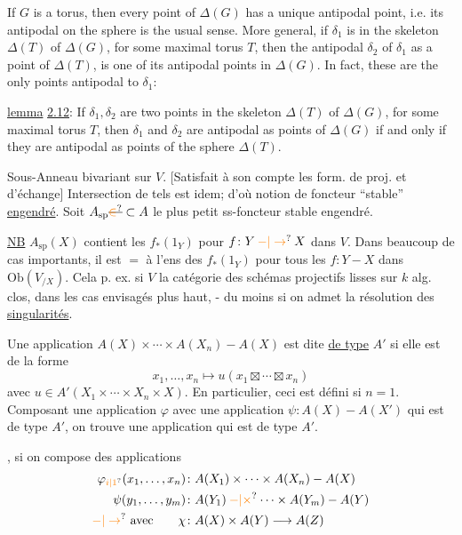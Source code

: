If $G$ is a torus, then every point of $\Delta(G)$ has a unique antipodal point, i.e. its antipodal on the sphere is the usual sense. More general, if $\delta_1$ is in the skeleton $\Delta(T)$ of $\Delta(G)$, for some maximal torus $T$, then the antipodal $\delta_2$ of $\delta_1$ as a point of $\Delta(T)$, is one of its antipodal points in $\Delta(G)$. In fact, these are the only points antipodal to $\delta_1$:

\uline{lemma} \uline{2.12}: If $\delta_1,\delta_2$ are two points in the skeleton $\Delta(T)$ of $\Delta(G)$, for some maximal torus $T$, then $\delta_1$ and $\delta_2$ are antipodal as points of $\Delta(G)$ if and only if they are antipodal as points of the sphere $\Delta(T)$.


Sous-Anneau bivariant sur $V$. [Satisfait à son compte les form. de proj. et d'échange] Intersection de tels est idem; d'où notion de foncteur ``stable'' \uline{engendré}. Soit $A_{\mathrm{sp}}\deleted{\unsure{\in}}\subset A$ le plus petit ss-foncteur stable engendré.

\uline{NB} $A_{\mathrm{sp}}(X)$ contient les $f_*(1_Y)$ pour $f\colon Y\mathbin{\unsure{-|\to}}X$ dans $V$. Dans beaucoup de cas importants, il est $=$  à l'ens des $f_*(1_Y)$ pour tous les $f\colon Y\mathbin{-}X$ dans $\mathrm{Ob}(V_{/X})$. Cela  p. ex. si $V$ la catégorie des schémas projectifs lisses  sur $k$ alg. clos, dans les cas envisagés plus haut, - du moins si on admet la résolution des \uline{singularités}.

Une application $A(X)\times\cdots\times A(X_n)\mathbin{-}A(X)$ est dite \uline{de type} $A'$ si elle est de la forme
\[
 x_1,\ldots,x_n\longmapsto u(x_1\boxtimes\cdots\boxtimes x_n)
\]
avec $u\in A'(X_1\times\cdots\times X_n\times X)$. En  particulier, ceci est défini si $n=1$. Composant une  application $\varphi$ avec une application $\psi\colon A(X)\mathbin{-}A(X')$ qui est de type $A'$, on trouve une application qui est de type $A'$.

,  si on compose des applications 
\[
\begin{aligned}
 \varphi_{\unsure{i|1}}(x_1,\ldots,x_n)&\colon A(X_1)\times\cdots\times A(X_n)\mathbin{-}A(X)\\
 \psi(y_1,\ldots,y_m)&\colon A(Y_1)\mathbin{\unsure{-|\times}}\cdots\times A(Y_m)\mathbin{-}A(Y)\\
 \mathbin{\unsure{-|\to}}\ \text{avec}\qquad\chi&\colon A(X)\times A(Y)\longrightarrow A(Z)
\end{aligned}
\]

